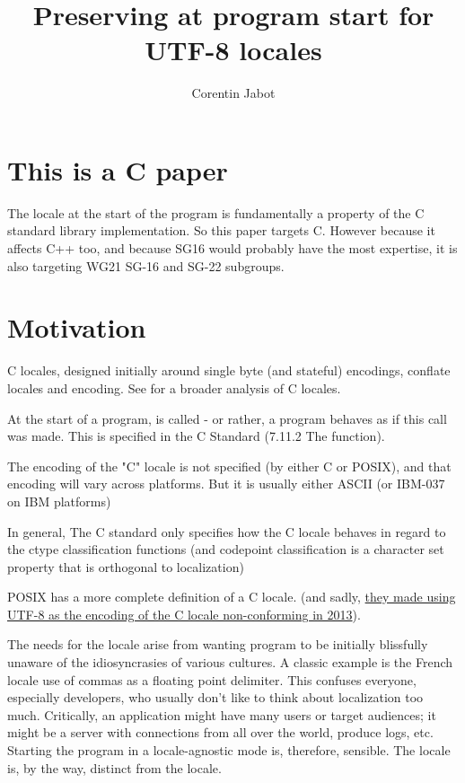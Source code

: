 \documentclass{wg21}
\title{Preserving \tcode{LC\_CTYPE} at program start for UTF-8 locales}
\author{Corentin Jabot}{corentin.jabot@gmail.com}
\begin{document}
\maketitle

\section{This is a C paper}

The locale at the start of the program is fundamentally a property of the C standard library implementation.
So this paper targets C.
However because it affects C++ too, and because SG16 would probably have the most expertise, it is also targeting WG21 SG-16
and SG-22 subgroups.

\section{Motivation}

C locales, designed initially around single byte (and stateful) encodings, conflate locales and encoding.
See  for a broader analysis of C locales.

At the start of a program,  is called - or rather, a program behaves as if this call was made.
This is specified in the C Standard (7.11.2 The  function).

The encoding of the "C" locale is not specified (by either C or POSIX), and that encoding will vary across platforms.
But it is usually either ASCII (or IBM-037 on IBM platforms)

In general, The C standard only specifies how the C locale behaves in regard to the ctype classification functions
(and codepoint classification is a character set property that is orthogonal to localization)

POSIX has a more complete definition of a C locale. (and sadly, \href{https://www.austingroupbugs.net/view.php?id=663}{they made using UTF-8 as the encoding of the C locale non-conforming in 2013}).

The needs for the  locale arise from wanting  program to be initially blissfully unaware of the idiosyncrasies
of various cultures. A classic example is the French locale use of commas as a floating point delimiter. This confuses everyone, especially developers,
who usually don't like to think about localization too much. Critically, an application might have many users or target audiences; it might be a server with connections from all over the world, produce logs, etc. Starting the program in a locale-agnostic mode is, therefore, sensible.
The  locale is, by the way, distinct from the  locale.
\end{document}
